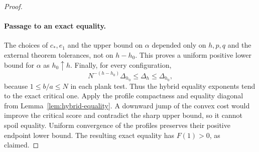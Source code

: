 \begin{proof}
\paragraph{Passage to an exact equality.}
The choices of $c_*,e_1$ and the upper bound on $\alpha$ depended
only on $h,p,q$ and the external theorem tolerances, not on
$h-h_0$.  This proves a uniform positive lower bound for
$\alpha$ as $h_0\uparrow h$.
Finally, for every configuration,
\[
 N^{-(h-h_0)}\Delta_{h_0}\leq\Delta_h\leq\Delta_{h_0},
\]
because $1\leq b/a\leq N$ in each plank test.
Thus the hybrid equality exponents tend to the exact critical
one.  Apply the profile compactness and equality diagonal from
Lemma~\ref{lem:hybrid-equality}.  A downward jump of the convex
cost would improve the critical score and contradict the sharp
upper bound, so it cannot spoil equality.  Uniform convergence
of the profiles preserves their positive endpoint lower bound.
The resulting exact equality has $F(1)>0$, as claimed.
\end{proof}

